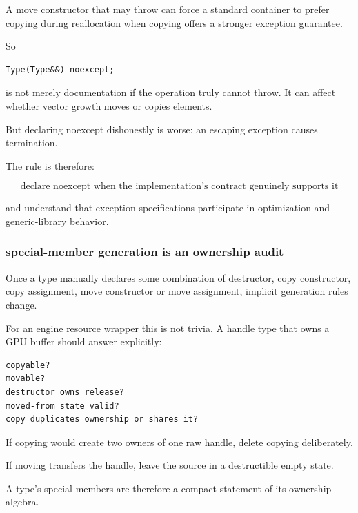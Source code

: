 \hypertarget{01-foundations-i-ch005-noexcept-can-change-which-operation-a-container-is-willing-to-use}{}

A move constructor that may throw can force a standard container to prefer copying during reallocation when copying offers a stronger exception guarantee.

So

\begin{verbatim}
Type(Type&&) noexcept;
\end{verbatim}

is not merely documentation if the operation truly cannot throw. It can affect whether vector growth moves or copies elements.

But declaring noexcept dishonestly is worse: an escaping exception causes termination.

The rule is therefore:

\[
\boxed{
\text{declare noexcept when the implementation's contract genuinely supports it}
}
\]

and understand that exception specifications participate in optimization and generic-library behavior.

\subsubsection{special-member generation is an ownership audit}\label{01-foundations-i-ch005-special-member-generation-is-an-ownership-audit}

\hypertarget{01-foundations-i-ch005-special-member-generation-is-an-ownership-audit}{}

Once a type manually declares some combination of destructor, copy constructor, copy assignment, move constructor or move assignment, implicit generation rules change.

For an engine resource wrapper this is not trivia. A handle type that owns a GPU buffer should answer explicitly:

\begin{verbatim}
copyable?
movable?
destructor owns release?
moved-from state valid?
copy duplicates ownership or shares it?
\end{verbatim}

If copying would create two owners of one raw handle, delete copying deliberately.

If moving transfers the handle, leave the source in a destructible empty state.

A type's special members are therefore a compact statement of its ownership algebra.

